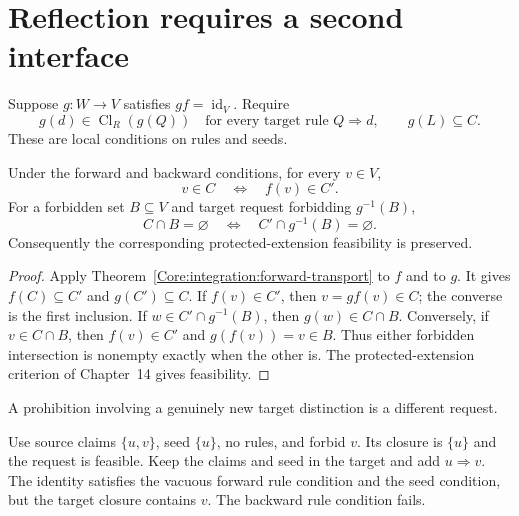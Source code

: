 \section{Reflection requires a second interface}
Suppose $g:W\to V$ satisfies $gf=\operatorname{id}_V$. Require
\[
g(d)\in\operatorname{Cl}_{R}(g(Q))\quad\text{for every target rule }Q\Rightarrow d,
\qquad g(L)\subseteq C.
\]
These are local conditions on rules and seeds.
\begin{Coretheorem}
Under the forward and backward conditions, for every $v\in V$,
\[
v\in C\quad\Longleftrightarrow\quad f(v)\in C'.
\]
For a forbidden set $B\subseteq V$ and target request forbidding $g^{-1}(B)$,
\[
C\cap B=\varnothing\quad\Longleftrightarrow\quad C'\cap g^{-1}(B)=\varnothing.
\]
Consequently the corresponding protected-extension feasibility is preserved.
\end{Coretheorem}
\begin{proof}
Apply Theorem~\ref{Core:integration:forward-transport} to $f$ and to $g$. It gives $f(C)\subseteq C'$ and $g(C')\subseteq C$. If $f(v)\in C'$, then $v=gf(v)\in C$; the converse is the first inclusion. If $w\in C'\cap g^{-1}(B)$, then $g(w)\in C\cap B$. Conversely, if $v\in C\cap B$, then $f(v)\in C'$ and $g(f(v))=v\in B$. Thus either forbidden intersection is nonempty exactly when the other is. The protected-extension criterion of Chapter~14 gives feasibility.
\end{proof}
A prohibition involving a genuinely new target distinction is a different request.
\begin{Corecounterexample}
Use source claims $\{u,v\}$, seed $\{u\}$, no rules, and forbid $v$. Its closure is $\{u\}$ and the request is feasible. Keep the claims and seed in the target and add $u\Rightarrow v$. The identity satisfies the vacuous forward rule condition and the seed condition, but the target closure contains $v$. The backward rule condition fails.
\end{Corecounterexample}

